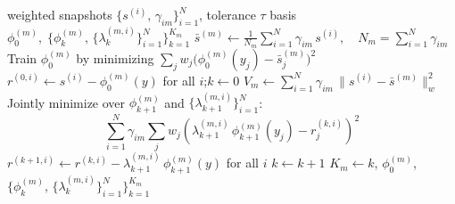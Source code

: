 \documentclass[preprint,10pt]{elsarticle}
\begin{document}
\begin{algorithm}[H]
\caption{\textsc{NeuralBasis}}
\label{alg:npod}
\begin{algorithmic}[1]
\Require weighted snapshots $\{s^{(i)},\,\gamma_{im}\}_{i=1}^N$, tolerance $\tau$
\Ensure basis $\phi_0^{(m)},\;\bigl\{\phi_k^{(m)},\,\{\lambda_k^{(m,i)}\}_{i=1}^N\bigr\}_{k=1}^{K_m}$
\State $\bar{s}^{(m)} \leftarrow \displaystyle\frac{1}{N_m}\sum_{i=1}^N \gamma_{im}\,s^{(i)},\quad N_m = \sum_{i=1}^N\gamma_{im}$
  \hfill{}
\State Train $\phi_0^{(m)}$ by minimizing
  $\displaystyle\sum_j w_j\bigl(\phi_0^{(m)}(y_j) - \bar{s}^{(m)}_j\bigr)^2$
\State $r^{(0,i)} \leftarrow s^{(i)} - \phi_0^{(m)}(y)$
  \enspace for all $i$;\enspace $k \leftarrow 0$
\State $V_m \leftarrow \displaystyle\sum_{i=1}^N \gamma_{im}\,\|s^{(i)}-\bar{s}^{(m)}\|_w^2$
  \hfill{}
  \State Jointly minimize over $\phi_{k+1}^{(m)}$ and
    $\{\lambda_{k+1}^{(m,i)}\}_{i=1}^N$:
    \[
      \sum_{i=1}^N \gamma_{im}
      \sum_j w_j\!\left(\lambda_{k+1}^{(m,i)}\,\phi_{k+1}^{(m)}(y_j)
      - r^{(k,i)}_j\right)^{\!2}
    \]
  \State $r^{(k+1,i)} \leftarrow r^{(k,i)}
    - \lambda_{k+1}^{(m,i)}\,\phi_{k+1}^{(m)}(y)$
    \enspace for all $i$
  \State $k \leftarrow k + 1$
\EndWhile
\State \Return $K_m \!\leftarrow\! k$,\enspace
  $\phi_0^{(m)}$,\enspace
  $\bigl\{\phi_k^{(m)},\,\{\lambda_k^{(m,i)}\}_{i=1}^N\bigr\}_{k=1}^{K_m}$
\end{algorithmic}
\end{algorithm}
\end{document}
